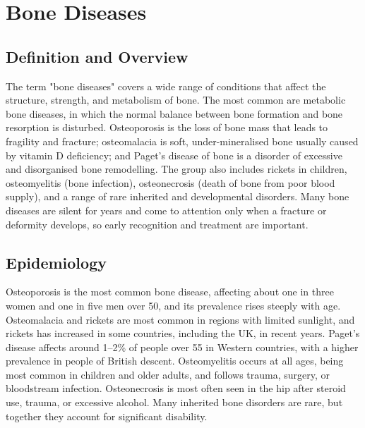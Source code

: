 \chapter{Bone Diseases}

\section*{Definition and Overview}
The term "bone diseases" covers a wide range of conditions that affect the structure, strength, and metabolism of bone. The most common are metabolic bone diseases, in which the normal balance between bone formation and bone resorption is disturbed. Osteoporosis is the loss of bone mass that leads to fragility and fracture; osteomalacia is soft, under-mineralised bone usually caused by vitamin D deficiency; and Paget's disease of bone is a disorder of excessive and disorganised bone remodelling. The group also includes rickets in children, osteomyelitis (bone infection), osteonecrosis (death of bone from poor blood supply), and a range of rare inherited and developmental disorders. Many bone diseases are silent for years and come to attention only when a fracture or deformity develops, so early recognition and treatment are important.

\section*{Epidemiology}
Osteoporosis is the most common bone disease, affecting about one in three women and one in five men over 50, and its prevalence rises steeply with age. Osteomalacia and rickets are most common in regions with limited sunlight, and rickets has increased in some countries, including the UK, in recent years. Paget's disease affects around 1--2\% of people over 55 in Western countries, with a higher prevalence in people of British descent. Osteomyelitis occurs at all ages, being most common in children and older adults, and follows trauma, surgery, or bloodstream infection. Osteonecrosis is most often seen in the hip after steroid use, trauma, or excessive alcohol. Many inherited bone disorders are rare, but together they account for significant disability.


